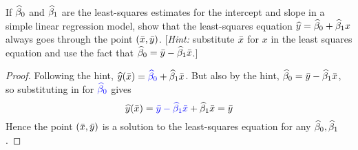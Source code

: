 If $\widehat{\beta}_0$ and $\widehat{\beta}_1$ are the least-squares estimates for the intercept and slope in a simple linear regression model, show that the least-squares equation $\widehat{y} = \widehat{\beta}_0 + \widehat{\beta}_1 x$ always goes through the point $(\bar{x}, \bar{y})$. [\textit{Hint:} substitute $\bar{x}$ for $x$ in the least squares equation and use the fact that $\widehat{\beta}_0 = \bar{y} - \widehat{\beta}_1 \bar{x}$.]

\begin{proof}
Following the hint, $\widehat{y}(\bar{x}) = \color{blue}{\widehat{\beta}_0}\color{black} + \widehat{\beta}_1 \bar{x}$. But also by the hint, $\widehat{\beta}_0 = \bar{y} - \widehat{\beta}_1 \bar{x}$, so substituting in for $\color{blue}{\widehat{\beta}_0}\color{black}$ gives 
$$\widehat{y}(\bar{x}) = \color{blue}{\bar{y}- \widehat{\beta}_1 \bar{x}}\color{black} + \widehat{\beta}_1 \bar{x} = \bar{y}$$
Hence the point $(\bar{x}, \bar{y})$ is a solution to the least-squares equation for any $\widehat{\beta}_0, \widehat{\beta}_1$.
\end{proof} 